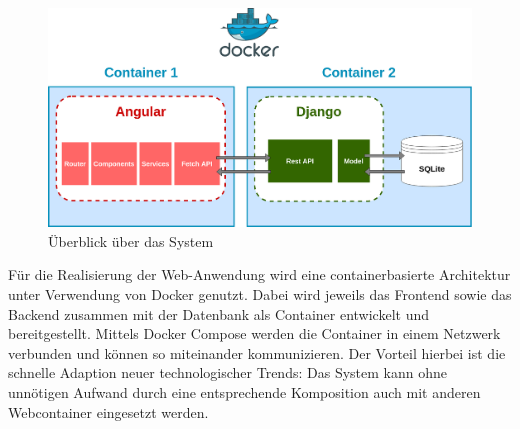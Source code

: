 \documentclass[conference]{IEEEtran}
\begin{document}
\begin{figure}[!h]
	\centering
	\includegraphics[width=0.9\columnwidth]{./figures/architecture_with_docker}
	\caption{Überblick über das System}
\end{figure}
Für die Realisierung der Web-Anwendung wird eine containerbasierte Architektur unter Verwendung von Docker genutzt. Dabei wird jeweils das Frontend sowie das Backend zusammen mit der Datenbank als Container entwickelt und bereitgestellt. Mittels Docker Compose werden die Container in einem Netzwerk verbunden und können so miteinander kommunizieren. Der Vorteil hierbei ist die schnelle Adaption neuer technologischer Trends: Das System kann ohne unnötigen Aufwand durch eine entsprechende Komposition auch mit anderen Webcontainer eingesetzt werden.
\pagebreak
\end{document}
